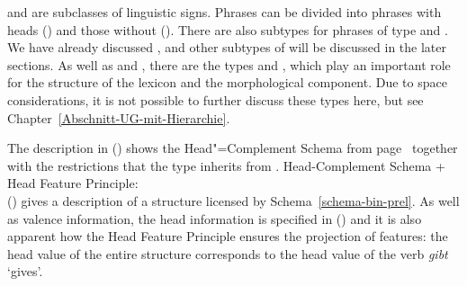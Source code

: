 \noindent
{} and  are subclasses of linguistic signs. Phrases can be divided into phrases with heads ()
and those without (). There are also subtypes for phrases of type  and .
We have already discussed , and other subtypes of  will be discussed in the later sections.
As well as  and , there are the types  and , which play an important role for the structure of the
lexicon and the morphological component. Due to space considerations, it is not possible to further discuss these types here,
but see Chapter~\ref{Abschnitt-UG-mit-Hierarchie}.

The description in () shows the Head"=Complement Schema from page~\pageref{schema-bin-prel} together with the restrictions that the type
 inherits from .
\eas
\label{head-arg-schema-hfp}
Head-Complement Schema + Head Feature Principle:\\
\zs
() gives a description of a structure licensed by Schema~\ref{schema-bin-prel}.
As well as valence information, the head information is specified in () and it is also apparent how the Head Feature Principle
ensures the projection of features: the head value of the entire structure  corresponds to
the head value of the verb \emph{gibt} `gives'.
\ea
